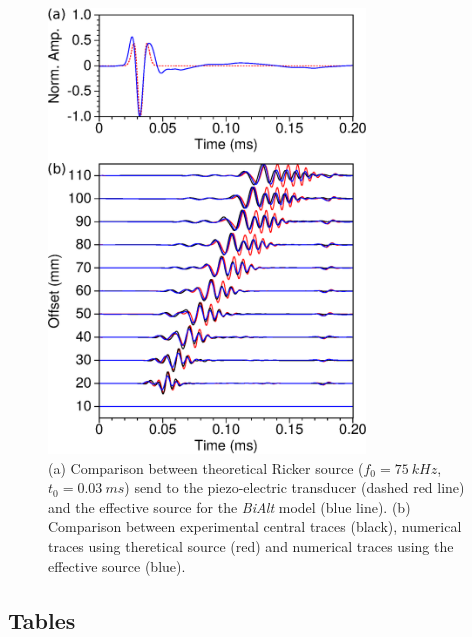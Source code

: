 \documentclass[manuscript,revised]{geophysics}
\newcommand{\bialt}{\textit{BiAlt} }
\begin{document}


\begin{figure}[!h]
	\centering
	\includegraphics[width=0.75\textwidth]{fig/panel_bialt_lswe.eps}
	\caption{(a) Comparison between theoretical Ricker source ($f_{0}=75\ kHz$, $t_{0}=0.03\ ms$) send to the piezo-electric transducer (dashed red line) and the effective source for the \bialt model (blue line). (b) Comparison between experimental central traces (black), numerical traces using theretical source (red) and numerical traces using the effective source (blue). }
	\label{blind-test}
\end{figure}

\clearpage
\newpage

\subsection*{Tables}
\end{document}
